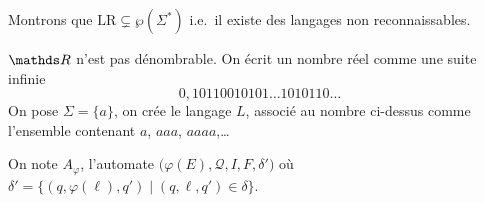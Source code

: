 \begin{exo}
	Montrons que $\mathrm{LR} \subsetneq \wp(\Sigma^*)$\/ i.e.\ il existe des langages non reconnaissables.

	$\R$\/ n'est pas dénombrable. On écrit un nombre réel comme une suite infinie \[0{,}10110010101\ldots1010110\ldots\] On pose $\Sigma = \{a\}$, on crée le langage $L$, associé au nombre ci-dessus comme l'ensemble contenant $a$, $aaa$, $aaaa$,\ldots
\end{exo}

\begin{rmk}[Notation]
	On note $A_\varphi$, l'automate $\big(\varphi(E), \mathcal{Q}, I, F, \delta')$\/ où $\delta' = \{(q,\varphi(\ell),q')  \mid (q,\ell,q') \in \delta\}$.
\end{rmk}

